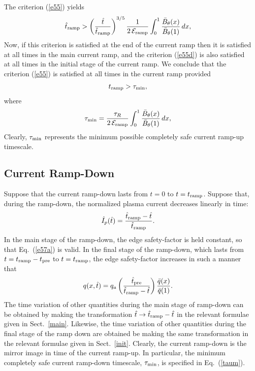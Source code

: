 \documentclass{iopjournal}
\begin{document}
The criterion (\ref{e55}) yields
\begin{equation}
\hat{t}_{\rm ramp} > \left(\frac{\hat{t}}{\hat{t}_{\rm ramp}}\right)^{3/5}\frac{1}{2\,{\cal E}_{\rm ramp}}\int_0^1\frac{\bar{B}_{\theta}(x)}{\bar{B}_\theta(1)}\,dx,
\end{equation}
Now, if this criterion is satisfied at the end of the current ramp then it is satisfied at all times in the main current ramp, and the criterion (\ref{e55d})
is also satisfied at all times in the initial stage of the current ramp. 
We conclude that the criterion (\ref{e55}) is satisfied at all times in the current ramp provided 
\begin{equation}
t_{\rm ramp} > \tau_{\rm min},
\end{equation}
where \begin{equation}\label{taum}
\tau_{\rm min}= \frac{\tau_R}{2\,{\cal E}_{\rm ramp}}\int_0^1\frac{\bar{B}_{\theta}(x)}{\bar{B}_\theta(1)}\,dx,
\end{equation}
Clearly, $\tau_{\rm min}$ represents the minimum possible completely safe current ramp-up timescale. 

\subsection{Current Ramp-Down}
Suppose that the current ramp-down lasts from $t=0$ to $t=t_{\rm ramp}$. Suppose that, during the ramp-down, 
the normalized plasma current decreases linearly in time:
\begin{equation}
\hat{I}_p(\hat{t}) = \frac{\hat{t}_{\rm ramp}-\hat{t}}{\hat{t}_{\rm ramp}}.
\end{equation}
In the main stage of the ramp-down, the edge safety-factor is held constant, so that Eq.~(\ref{e57a}) is valid.
In the final stage of the ramp-down, which lasts from $t=t_{\rm ramp}-t_{\rm pre}$ to $t=t_{\rm ramp}$,
the edge safety-factor increases in such a manner that 
\begin{equation}
q(x,\hat{t}) = q_a\left(\frac{\hat{t}_{\rm pre}}{\hat{t}_{\rm ramp}-\hat{t}}\right)\frac{\bar{q}(x)}{\bar{q}(1)}.
\end{equation}
The time variation of other quantities during the main stage of ramp-down can be obtained by making the transformation
$\hat{t}\rightarrow \hat{t}_{\rm ramp} - \hat{t}$ in the relevant formulae  given in Sect.~\ref{main}. Likewise,
the time variation of other quantities during the final stage of the ramp down are obtained be making the
same transformation in the relevant formulae given in Sect.~\ref{init}. Clearly, the current ramp-down is the mirror image in time of the current ramp-up.
In particular, the minimum completely safe current
ramp-down timescale, $\tau_{\rm min}$, is specified in Eq.~(\ref{taum}). 
\end{document}
